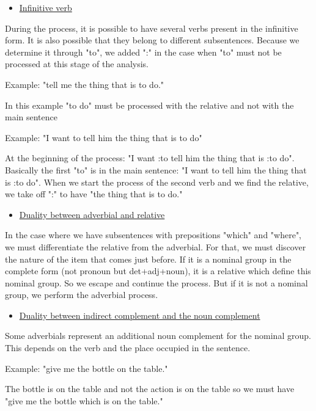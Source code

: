 \documentclass[twoside,a4paper,10pt]{report}
\newcommand{\dokuunderline}[1]{\underline{#1}}
\newcommand{\dokuitem}{\item}
\begin{document}
\begin{itemize}
\dokuitem  \dokuunderline{Infinitive verb}
\end{itemize}
During the process, it is possible to have several verbs present in the infinitive form. It is also possible that they belong to different subsentences. Because we determine it through "to", we added ":" in the case when "to" must not be processed at this stage of the analysis.


\small
\begin{verbatimtab}
  Example: "tell me the thing that is to do."
\end{verbatimtab}
\normalsize
In this example "to do" must be processed with the relative and not with the main sentence


\small
\begin{verbatimtab}
  Example: "I want to tell him the thing that is to do"
\end{verbatimtab}
\normalsize
At the beginning of the process: "I want :to tell him the thing that is :to do". Basically the first "to" is in the main sentence: "I want to tell him the thing that is :to do". When we start the process of the second verb and we find the relative, we take off ":" to have "the thing that is to do."



\begin{itemize}
\dokuitem  \dokuunderline{Duality between adverbial and relative}
\end{itemize}
In the case where we have subsentences with prepositions "which" and "where", we must differentiate the relative from the adverbial. For that, we must discover the nature of the item that comes just before. If it is a nominal group in the complete form (not pronoun but det+adj+noun), it is a relative which define this nominal group. So we escape and continue the process. But if it is not a nominal group, we perform the adverbial process.



\begin{itemize}
\dokuitem  \dokuunderline{Duality between indirect complement and the noun complement}
\end{itemize}
Some adverbials represent an additional noun complement for the nominal group. This depends on the verb and the place occupied in the sentence.


\small
\begin{verbatimtab}
  Example: "give me the bottle on the table."
\end{verbatimtab}
\normalsize
The bottle is on the table and not the action is on the table so we must have "give me the bottle which is on the table."
\end{document}
